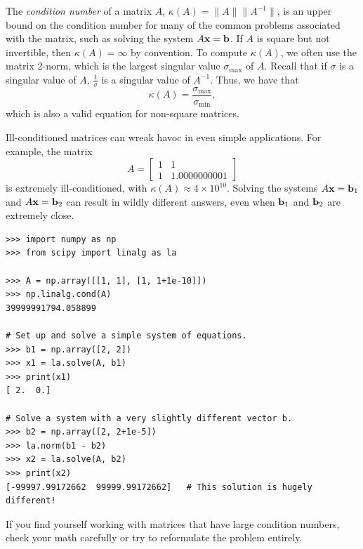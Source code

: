 The \emph{condition number} of a matrix $A$, $\kappa (A)=\|A\| \|A^{-1}\|$, is an upper bound on the condition number for many of the common problems associated with the matrix, such as solving the system $A\mathbf{x} =\mathbf{b}$.
If $A$ is square but not invertible, then $\kappa(A) = \infty$ by convention.
To compute $\kappa(A)$, we often use the matrix 2-norm, which is the largest singular value $\sigma_{\max}$ of $A$.
Recall that if $\sigma$ is a singular value of $A$, $\frac{1}{\sigma}$ is a singular value of $A^{-1}$.
Thus, we have that
\begin{equation}\label{eq:matrix_cond}
\kappa(A) = \frac{\sigma_{\max}}{\sigma_{\min}},
\end{equation}
which is also a valid equation for non-square matrices.

\begin{warn} %
Ill-conditioned matrices can wreak havoc in even simple applications.
For example, the matrix
\[
A =
\left[\begin{array}{cc}
1 & 1 \\
1 & 1.0000000001
\end{array}\right]
\]
is extremely ill-conditioned, with $\kappa(A) \approx 4\times 10^{10}$.
Solving the systems $A\mathbf{x} = \mathbf{b}_1$ and $A\mathbf{x} = \mathbf{b}_2$ can result in wildly different answers, even when $\mathbf{b}_1$ and $\mathbf{b}_2$ are extremely close.

\begin{lstlisting}
>>> import numpy as np
>>> from scipy import linalg as la

>>> A = np.array([[1, 1], [1, 1+1e-10]])
>>> np.linalg.cond(A)
39999991794.058899

# Set up and solve a simple system of equations.
>>> b1 = np.array([2, 2])
>>> x1 = la.solve(A, b1)
>>> print(x1)
[ 2.  0.]

# Solve a system with a very slightly different vector b.
>>> b2 = np.array([2, 2+1e-5])
>>> la.norm(b1 - b2)
>>> x2 = la.solve(A, b2)
>>> print(x2)
[-99997.99172662  99999.99172662]   # This solution is hugely different!
\end{lstlisting}

If you find yourself working with matrices that have large condition numbers, check your math carefully or try to reformulate the problem entirely.
\end{warn}

